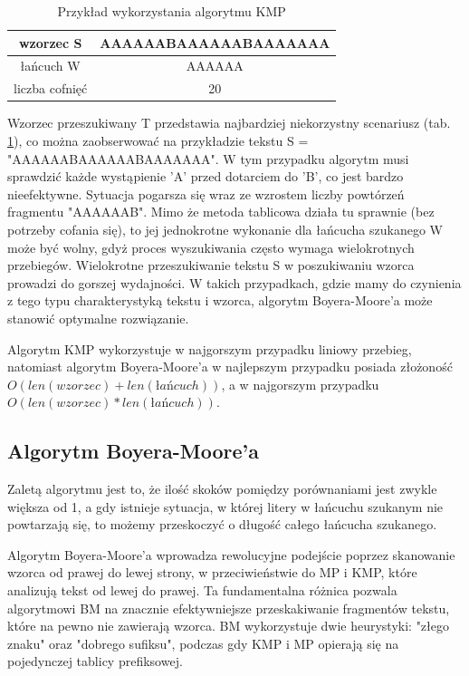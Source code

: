\begin{table}
  \centering
  \begin{tabular}{ |c|c|  } 
    \hline
    wzorzec S & AAAAAABAAAAAABAAAAAAA \\
    \hline
    łańcuch W & AAAAAA \\
    \hline
    liczba cofnięć & 20 \\
    \hline
  \end{tabular}
  \caption{Przykład wykorzystania algorytmu KMP}
  \label{tabela:KMPExampleSlow}
\end{table}

Wzorzec przeszukiwany T przedstawia najbardziej niekorzystny scenariusz 
(tab. \ref{tabela:KMPExampleSlow}), co można zaobserwować na przykładzie tekstu 
S = "AAAAAABAAAAAABAAAAAAA". W tym przypadku algorytm musi sprawdzić każde
wystąpienie 'A' przed dotarciem do 'B', co jest bardzo nieefektywne. Sytuacja 
pogarsza się wraz ze wzrostem liczby powtórzeń fragmentu "AAAAAAB". Mimo że 
metoda tablicowa działa tu sprawnie (bez potrzeby cofania się), to jej 
jednokrotne wykonanie dla łańcucha szukanego W może być wolny, gdyż proces
wyszukiwania często wymaga wielokrotnych przebiegów. Wielokrotne przeszukiwanie
tekstu S w poszukiwaniu wzorca prowadzi do gorszej wydajności. W takich 
przypadkach, gdzie mamy do czynienia z tego typu charakterystyką tekstu 
i wzorca, algorytm Boyera-Moore'a może stanowić optymalne rozwiązanie.

Algorytm KMP wykorzystuje w najgorszym przypadku liniowy przebieg, natomiast
algorytm Boyera-Moore'a w najlepszym przypadku posiada złożoność $O({len(wzorzec)}+{len(łańcuch)})$, a w 
najgorszym przypadku $O({len(wzorzec)}*{len(łańcuch)})$.

\subsection{Algorytm Boyera-Moore'a}
\label{sch:algoBoyerMoore}

Zaletą algorytmu jest to, że ilość skoków pomiędzy porównaniami jest zwykle 
większa od 1, a gdy istnieje sytuacja, w której litery w łańcuchu szukanym nie
powtarzają się, to możemy przeskoczyć o długość całego łańcucha szukanego.

Algorytm Boyera-Moore'a wprowadza rewolucyjne podejście poprzez skanowanie 
wzorca od prawej do lewej strony, w przeciwieństwie do MP i KMP, które 
analizują tekst od lewej do prawej. Ta fundamentalna różnica pozwala algorytmowi BM na 
znacznie efektywniejsze przeskakiwanie fragmentów tekstu, które na pewno nie 
zawierają wzorca. BM wykorzystuje dwie heurystyki: "złego znaku" oraz "dobrego
sufiksu", podczas gdy KMP i MP opierają się na pojedynczej tablicy prefiksowej.

